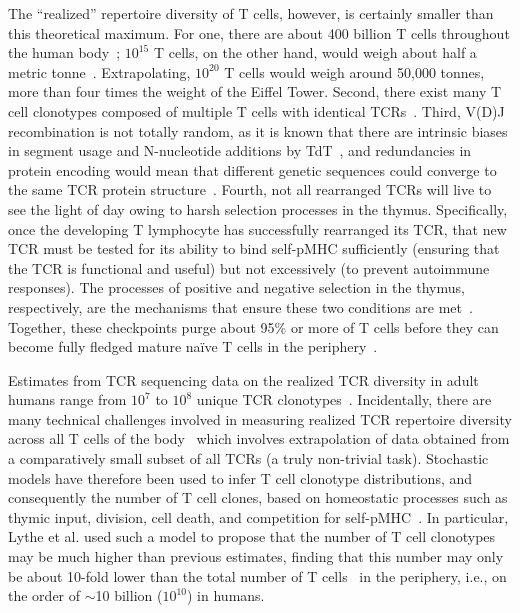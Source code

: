 The ``realized'' repertoire diversity of T cells, however, is certainly smaller than this theoretical maximum. For one, there are about 400 billion T cells throughout the human body~\cite{jenkins2009composition}; $10^{15}$ T cells, on the other hand, would weigh about half a metric tonne~\cite{lythe2016many}. Extrapolating, $10^{20}$ T cells would weigh around 50,000 tonnes, more than four times the weight of the Eiffel Tower. Second, there exist many T cell clonotypes composed of multiple T cells with identical TCRs~\cite{robins2009comprehensive,quigley2010convergent,zarnitsyna2013estimating,qi2014diversity,de2020naive}. Third, V(D)J recombination is not totally random, as it is known that there are intrinsic biases in segment usage and N-nucleotide additions by TdT~\cite{robins2010overlap,murugan2012statistical}, and redundancies in protein encoding would mean that different genetic sequences could converge to the same TCR protein structure~\cite{quigley2010convergent}. Fourth, not all rearranged TCRs will live to see the light of day owing to harsh selection processes in the thymus. Specifically, once the developing T lymphocyte has successfully rearranged its TCR, that new TCR must be tested for its ability to bind self-pMHC sufficiently (ensuring that the TCR is functional and useful) but not excessively (to prevent autoimmune responses). The processes of positive and negative selection in the thymus, respectively, are the mechanisms that ensure these two conditions are met~\cite{yates2014theories,klein2014positive,kondo2019thymus}. Together, these checkpoints purge about 95\% or more of T cells before they can become fully fledged mature na\"{i}ve T cells in the periphery~\cite{kyewski2006central}.

Estimates from TCR sequencing data on the realized TCR diversity in adult humans range from $10^7$ to $10^8$ unique TCR clonotypes~\cite{robins2009comprehensive,qi2014diversity,de2020naive}. Incidentally, there are many technical challenges involved in measuring realized TCR repertoire diversity across all T cells of the body~\cite{zarnitsyna2013estimating,mora2019many} which involves extrapolation of data obtained from a comparatively small subset of all TCRs (a truly non-trivial task). Stochastic models have therefore been used to infer T cell clonotype distributions, and consequently the number of T cell clones, based on homeostatic processes such as thymic input, division, cell death, and competition for self-pMHC~\cite{desponds2016fluctuating,lythe2016many,mora2019many}. In particular, Lythe et al. used such a model to propose that the number of T cell clonotypes may be much higher than previous estimates, finding that this number may only be about 10-fold lower than the total number of T cells~\cite{lythe2016many} in the periphery, i.e., on the order of $\sim$10 billion ($10^{10}$) in humans.

